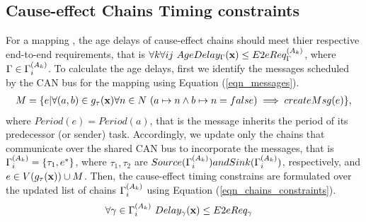 \subsection{Cause-effect Chains Timing constraints}
For a mapping \x, the age delays of cause-effect chains should meet thier respective end-to-end requirements, that is $\forall k\forall ij\ AgeDelay_\Gamma(\x)\leq \sss{E2eReq}[k][\Gamma]$, where $\Gamma\in \sss{\Gamma}$. To calculate the age delays, first we identify the messages scheduled by the CAN bus for the mapping \ttx using Equation (\ref{eqn_messages}). 
\begin{align}
\label{eqn_messages}
	M=\{e|\forall (a,b)\in g_\tau(\textbf{x})\forall n\in N\ (a\mapsto n \land b\mapsto n=false)\implies createMsg(e)\},
\end{align}
where $Period(e)=Period(a)$, that is the message inherits the period of its predecessor (or sender) task. Accordingly, we update only the chains that communicate over the shared CAN bus to incorporate the messages, that is $\sss{\Gamma}=\{\tau_1,e^*\}$, where $\tau_1,\tau_2$ are $Source(\sss{\Gamma}) and Sink(\sss{\Gamma})$, respectively, and $e\in V(g_\tau(\textbf{x}))\cup M$. Then, the cause-effect timing constrains are formulated over the updated list of chains $\sss{\Gamma}$ using Equation (\ref{eqn_chains_constraints}).
\begin{align}
\label{eqn_chains_constraints}
\forall \gamma \in \sss{\Gamma} \ Delay_\gamma(\x)&\leq E2eReq_\gamma
\end{align}

